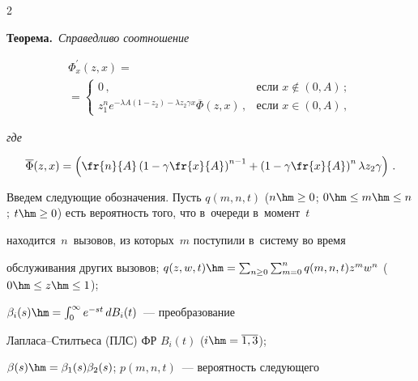 \begin{multicols}{2}
  


  \smallskip


  


  \noindent


  \textbf{Теорема.}\ \textit{Справедливо соотношение}


  \begin{multline*}


  \Phi^\prime_{x} (z,x)={}\\


  {}= \begin{cases}


  0\,, &\!\mbox{если } x\notin (0,A)\,;\\


  z_1^n e^{-\lambda A(1-z_2)-\lambda z_2\gamma x}\overline{\Phi}(z,x)\,, & 


\!\mbox{если } x\in (0,A)\,,


  \end{cases}


  \end{multline*}


\textit{где} 


$$


\overline{\Phi}(z,x)=\left( \fr{n}{A}\left( 1- \gamma\fr{x}{A}\right)^{n-1} +\left( 


1-\gamma\fr{x}{A}\right)^n \lambda z_2 \gamma\right)\,.


$$





\smallskip


  


  Введем следующие обозначения. Пусть $q(m,n,t)$ ($n\hm\geq 0$; $0\hm\leq 


m\hm\leq n$; $t\hm\geq0$) есть вероятность того, что в~очереди в~момент~$t$ 


находится~$n$~вызовов, из которых~$m$ поступили в~сис\-те\-му во время 


обслуживания других вызовов; $q(z,w,t)\hm= \sum\nolimits_{n\geq0} 


\sum\nolimits^n_{m=0} q(m,n,t) z^m w^n$ ($0\hm\leq z\hm\leq 1$); 


$\beta_i(s)\hm= \int\nolimits_0^\infty e^{-s t}\,dB_i(t)$~--- преобразование 


Лап\-ла\-са--Стилть\-еса (ПЛС) ФР $B_i(t)$ ($i\hm= \overline{1,3}$); 


$\beta(s)\hm= \beta_1(s)\beta_2(s)$; $p(m,n,t)$~--- вероятность следующего 



\end{multicols}
